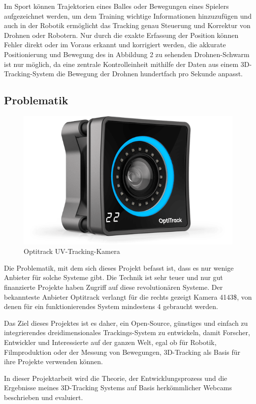 \documentclass[12pt, ngerman]{article}
\begin{document}
Im Sport können Trajektorien eines Balles oder Bewegungen eines Spielers aufgezeichnet werden, um dem Training wichtige Informationen hinzuzufügen und auch in der Robotik ermöglicht das Tracking genau Steuerung und Korrektur von Drohnen oder Robotern. Nur durch die exakte Erfassung der Position können Fehler direkt oder im Voraus erkannt und korrigiert werden, die akkurate Positionierung und Bewegung des in Abbildung 2 zu sehenden Drohnen-Schwarm ist nur möglich, da eine zentrale Kontrolleinheit mithilfe der Daten aus einem 3D-Tracking-System die Bewegung der Drohnen hundertfach pro Sekunde anpasst. 
\subsection{Problematik}
\begin{figure}
\centering
  {\setlength{\belowcaptionskip}{-10pt}
    \includegraphics[angle=0,width=\linewidth]{4143.png}
    \caption{Optitrack UV-Tracking-Kamera}
  }
\end{figure}
Die Problematik, mit dem sich dieses Projekt befasst ist, dass es nur wenige Anbieter für solche Systeme gibt. Die Technik ist sehr teuer und nur gut finanzierte Projekte haben Zugriff auf diese revolutionären Systeme. Der bekannteste Anbieter Optitrack verlangt für die rechts gezeigt Kamera 4143\$, von denen für ein funktionierendes System mindestens 4 gebraucht werden. 

Das Ziel dieses Projektes ist es daher, ein Open-Source, günstiges und einfach zu integrierendes dreidimensionales Trackings-System zu entwickeln, damit Forscher, Entwickler und Interessierte auf der ganzen Welt, egal ob für Robotik, Filmproduktion oder der Messung von Bewegungen, 3D-Tracking als Basis für ihre Projekte verwenden können. \par
In dieser Projektarbeit wird die Theorie, der Entwicklungsprozess und die Ergebnisse meines 3D-Tracking Systems auf Basis herkömmlicher Webcams beschrieben und evaluiert.  
\newpage
\end{document}
